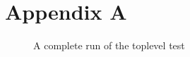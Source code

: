 \section{Appendix A}

\begin{figure}[ht!]
    \begin{center}
    \caption{A complete run of the toplevel test}
    \label{fig:tb_toplevel}
    \end{center}
\end{figure}
